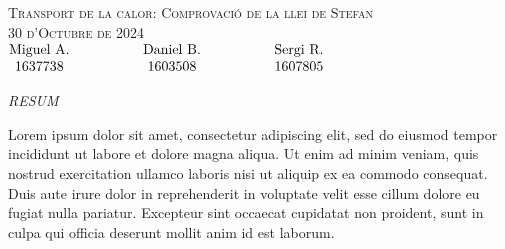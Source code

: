 \documentclass[12pt,twosides,onecolumn,openany]{article}
\begin{document}
\begin{center}
    {\Large \textsc{Transport de la calor: Comprovació de la llei de Stefan}}\\
    \vspace{0.2cm}
    \textsc{30 d'Octubre de 2024}\\
    \vspace{0.2cm}
    $\begin{matrix} 
    \text{Miguel A.} \hspace{1.5cm} & \text{Daniel B.} & \hspace{1.5cm} \text{Sergi R.}\\1637738 \hspace{1.5cm} & 1603508 & \hspace{1.5cm} 1607805
    \end{matrix}$
\end{center}
\begin{center}
    \textsc{\textit{RESUM}}
\end{center}
Lorem ipsum dolor sit amet, consectetur adipiscing elit, sed do eiusmod tempor incididunt ut labore et dolore magna aliqua. Ut enim ad minim veniam, quis nostrud exercitation ullamco laboris nisi ut aliquip ex ea commodo consequat. Duis aute irure dolor in reprehenderit in voluptate velit esse cillum dolore eu fugiat nulla pariatur. Excepteur sint occaecat cupidatat non proident, sunt in culpa qui officia deserunt mollit anim id est laborum.
\vspace{0.5cm}
\end{document}
